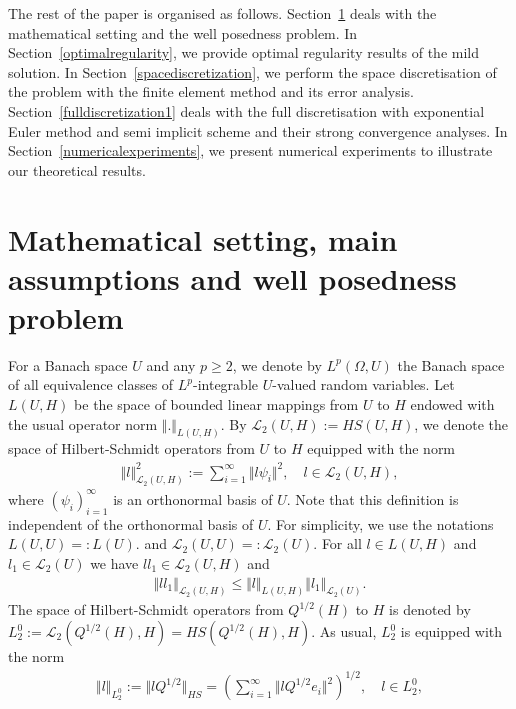 \documentclass[review,12pt]{elsarticle}
\newcommand{\secref}[1]{{Section~\ref{#1}}}
\begin{document}
 The rest of the paper is organised as follows.  \secref{wellposed} deals with the mathematical setting and the well posedness problem. In \secref{optimalregularity}, we provide optimal regularity results of the mild solution. In \secref{spacediscretization}, we perform the space discretisation of the problem with the finite element method and its error analysis. \secref{fulldiscretization1} deals with the full discretisation with exponential Euler method  and  semi implicit  scheme and their strong convergence 
analyses. 
In \secref{numericalexperiments}, we present numerical experiments to illustrate our theoretical results.
 
 
 \section{Mathematical setting,  main assumptions and well posedness problem}
 \label{wellposed}
 For a Banach space $U$ and any $p\geq 2$, we denote by $L^p(\Omega, U)$ the Banach space of all equivalence classes of $L^p$-integrable $U$-valued random variables. Let $L(U,H)$ be 
 the space of bounded linear mappings from $U$ to $H$ endowed with the usual  operator norm $\Vert .\Vert_{L(U,H)}$. 
 By  $\mathcal{L}_2(U,H):=HS(U,H)$,
 we  denote the space of Hilbert-Schmidt operators from $U$ to $H$ equipped with the norm 
 \begin{eqnarray}
 \Vert l\Vert^2_{\mathcal{L}_2(U,H)}:=\sum\limits_{i=1}^{\infty}\Vert l\psi_i\Vert^2, \quad  l\in \mathcal{L}_2(U,H),
 \end{eqnarray}
  where $(\psi_i)_{i=1}^{\infty}$ is an orthonormal basis of $U$. Note that this definition is independent of the orthonormal basis of $U$.  
For simplicity, we use the notations $L(U,U)=:L(U)$. and $\mathcal{L}_2(U,U)=:\mathcal{L}_2(U)$. 
 For all $l\in L(U,H)$ and $l_1\in\mathcal{L}_2(U)$ we have $ll_1\in\mathcal{L}_2(U,H)$ and 
\begin{eqnarray}
\label{chow1}
\Vert ll_1\Vert_{\mathcal{L}_2(U,H)}\leq \Vert l\Vert_{L(U,H)}\Vert l_1\Vert_{\mathcal{L}_2(U)}.
\end{eqnarray} 
 The space of Hilbert-Schmidt operators from  $Q^{1/2}(H)$ to $H$ is denoted by $L^0_2:=\mathcal{L}_2(Q^{1/2}(H),H)=HS(Q^{1/2}(H),H)$. As usual, $L^0_2$ is equipped with the norm
 \begin{eqnarray}
 \Vert l\Vert_{L^0_2} :=\Vert lQ^{1/2}\Vert_{HS}=\left(\sum\limits_{i=1}^{\infty}\Vert lQ^{1/2}e_i\Vert^2\right)^{1/2}, \quad  l\in L^0_2,
 \end{eqnarray}
\end{document}
